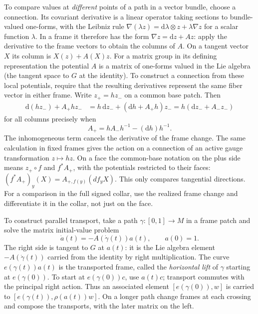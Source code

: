 To compare values at \emph{different} points of a path in a vector bundle, choose a connection. Its covariant derivative is a linear operator taking sections to bundle-valued one-forms, with the Leibniz rule $\nabla(\lambda z)=\mathrm{d}\lambda\otimes z+\lambda\nabla z$ for a scalar function $\lambda$. In a frame it therefore has the form $\nabla z=\mathrm{d}z+A z$: apply the derivative to the frame vectors to obtain the columns of $A$. On a tangent vector $X$ its column is $X(z)+A(X)z$. For a matrix group in its defining representation the potential $A$ is a matrix of one-forms valued in the Lie algebra (the tangent space to $G$ at the identity). To construct a connection from these local potentials, require that the resulting derivatives represent the same fiber vector in either frame. Write $z_+=h z_-$ on a common base patch. Then
\begin{align*}
 \mathrm{d}(h z_-)+A_+h z_-
 &=h\,\mathrm{d}z_-+(\mathrm{d}h+A_+h)z_-
 =h(\mathrm{d}z_-+A_-z_-)
\end{align*}
for all columns precisely when
\begin{equation}
 A_+=h A_-h^{-1}-(\mathrm{d}h)h^{-1} .\label{eq:D-bundle-connection}
\end{equation}
The inhomogeneous term cancels the derivative of the frame change. The same calculation in fixed frames gives the action on a connection of an active gauge transformation $z\mapsto h z$. On a face the common-base notation on the plus side means $z_+\circ f$ and $f^*A_+$, with the potentials restricted to their faces: $(f^*A_+)_y(X)=A_{+,f(y)}(df_y X)$. This only compares tangential directions. For a comparison in the full signed collar, use the realized frame change and differentiate it in the collar, not just on the face.

To construct parallel transport, take a path $\gamma:[0,1]\to M$ in a frame patch and solve the matrix initial-value problem
\[
 \dot a(t)=-A(\dot\gamma(t))a(t),\qquad a(0)=1 .
\]
The right side is tangent to $G$ at $a(t)$: it is the Lie algebra element $-A(\dot\gamma(t))$ carried from the identity by right multiplication. The curve $e(\gamma(t))a(t)$ is the transported frame, called the \emph{horizontal lift} of $\gamma$ starting at $e(\gamma(0))$. To start at $e(\gamma(0))c$, use $a(t)c$; transport commutes with the principal right action. Thus an associated element $[e(\gamma(0)),w]$ is carried to $[e(\gamma(t)),\rho(a(t))w]$. On a longer path change frames at each crossing and compose the transports, with the later matrix on the left.


